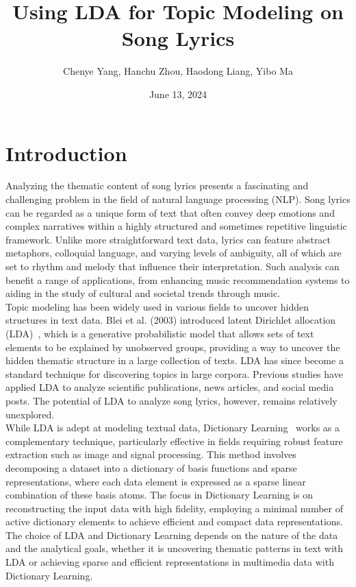 \documentclass{article}
\title{Using LDA for Topic Modeling on Song Lyrics}
\author{Chenye Yang, Hanchu Zhou, Haodong Liang, Yibo Ma}
\date{June 13, 2024}
\begin{document}
\maketitle

\section{Introduction}\label{sec:introduction}

Analyzing the thematic content of song lyrics presents a fascinating and challenging problem in the field of natural language processing (NLP). Song lyrics can be regarded as a unique form of text that often convey deep emotions and complex narratives within a highly structured and sometimes repetitive linguistic framework. Unlike more straightforward text data, lyrics can feature abstract metaphors, colloquial language, and varying levels of ambiguity, all of which are set to rhythm and melody that influence their interpretation. Such analysis can benefit a range of applications, from enhancing music recommendation systems to aiding in the study of cultural and societal trends through music.\\

\noindent Topic modeling has been widely used in various fields to uncover hidden structures in text data. Blei et al. (2003) introduced latent Dirichlet allocation (LDA)~\cite{blei2003latent}, which is a generative probabilistic model that allows sets of text elements to be explained by unobserved groups, providing a way to uncover the hidden thematic structure in a large collection of texts. LDA has since become a standard technique for discovering topics in large corpora. Previous studies have applied LDA to analyze scientific publications, news articles, and social media posts. The potential of LDA to analyze song lyrics, however, remains relatively unexplored. \\

\noindent While LDA is adept at modeling textual data, Dictionary Learning~\cite{olshausen1996emergence, arora2018linear} works as a complementary technique, particularly effective in fields requiring robust feature extraction such as image and signal processing. This method involves decomposing a dataset into a dictionary of basis functions and sparse representations, where each data element is expressed as a sparse linear combination of these basis atoms. The focus in Dictionary Learning is on reconstructing the input data with high fidelity, employing a minimal number of active dictionary elements to achieve efficient and compact data representations. The choice of LDA and Dictionary Learning depends on the nature of the data and the analytical goals, whether it is uncovering thematic patterns in text with LDA or achieving sparse and efficient representations in multimedia data with Dictionary Learning.\\
\end{document}
